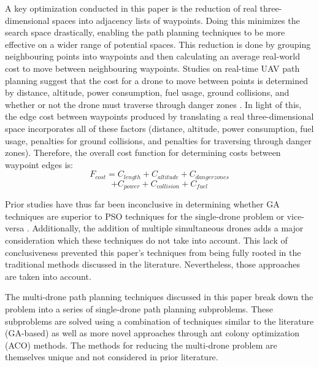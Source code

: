\documentclass[conference]{IEEEtran}
\begin{document}
A key optimization conducted in this paper is the reduction of real three-dimensional spaces into adjacency lists of waypoints. Doing this minimizes the search space drastically, enabling the path planning techniques to be more effective on a wider range of potential spaces. This reduction is done by grouping neighbouring points into waypoints and then calculating an average real-world cost to move between neighbouring waypoints. Studies on real-time UAV path planning suggest that the cost for a drone to move between points is determined by distance, altitude, power consumption, fuel usage, ground collisions, and whether or not the drone must traverse through danger zones \cite{b1}. In light of this, the edge cost between waypoints produced by translating a real three-dimensional space incorporates
all of these factors (distance, altitude, power consumption, fuel usage, penalties for ground collisions, and penalties for traversing through danger zones). Therefore, the overall cost function for determining costs between waypoint edges is:
$$F_{cost} = C_{length} + C_{altitude} + C_{danger zones}$$
$$ + C_{power} + C_{collision} + C_{fuel}$$

Prior studies have thus far been inconclusive in determining whether GA techniques are superior to PSO techniques for the single-drone problem \cite{b2} or vice-versa \cite{b3}. Additionally, the addition of multiple simultaneous drones adds a major consideration which these techniques do not take into account. This lack of conclusiveness prevented this paper's techniques from being fully rooted in the traditional methods discussed in the literature. Nevertheless, those approaches are taken into account.

The multi-drone path planning techniques discussed in this paper break down the problem into a series of single-drone path planning subproblems. These subproblems are solved using a combination of techniques similar to the literature (GA-based) as well as more novel approaches through ant colony optimization (ACO) methods. The methods for reducing the multi-drone problem are themselves unique and not considered in prior literature.
\end{document}
